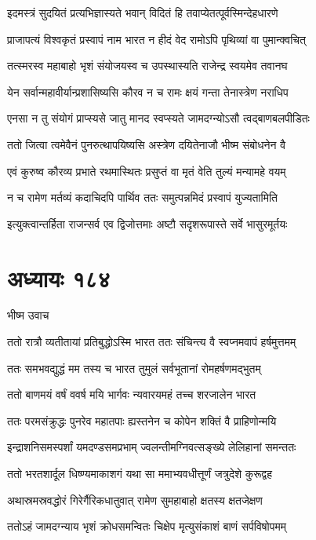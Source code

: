 \twolineshloka
{इदमस्त्रं सुदयितं प्रत्यभिज्ञास्यते भवान्}
{विदितं हि तवाप्येतत्पूर्वस्मिन्देहधारणे}


\twolineshloka
{प्राजापत्यं विश्वकृतं प्रस्वापं नाम भारत}
{न हीदं वेद रामोऽपि पृथिव्यां वा पुमान्क्वचित्}


\twolineshloka
{तत्स्मरस्व महाबाहो भृशं संयोजयस्व च}
{उपस्थास्यति राजेन्द्र स्वयमेव तवानघ}


\twolineshloka
{येन सर्वान्महावीर्यान्प्रशासिष्यसि कौरव}
{न च रामः क्षयं गन्ता तेनास्त्रेण नराधिप}


\twolineshloka
{एनसा न तु संयोगं प्राप्स्यसे जातु मानद}
{स्वप्स्यते जामदग्न्योऽसौ त्वद्बाणबलपीडितः}


\twolineshloka
{ततो जित्वा त्वमेवैनं पुनरुत्थापयिष्यसि}
{अस्त्रेण दयितेनाजौ भीष्म संबोधनेन वै}


\twolineshloka
{एवं कुरुष्व कौरव्य प्रभाते रथमास्थितः}
{प्रसुप्तं वा मृतं वेति तुल्यं मन्यामहे वयम्}


\twolineshloka
{न च रामेण मर्तव्यं कदाचिदपि पार्थिव}
{ततः समुत्पन्नमिदं प्रस्वापं युज्यतामिति}


\twolineshloka
{इत्युक्त्वान्तर्हिता राजन्सर्व एव द्विजोत्तमाः}
{अष्टौ सदृशरूपास्ते सर्वे भासुरमूर्तयः}


\chapter{अध्यायः १८४}
\twolineshloka
{भीष्म उवाच}
{}


\twolineshloka
{ततो रात्रौ व्यतीतायां प्रतिबुद्धोऽस्मि भारत}
{ततः संचिन्त्य वै स्वप्नमवापं हर्षमुत्तमम्}


\twolineshloka
{ततः समभवद्युद्धं मम तस्य च भारत}
{तुमुलं सर्वभूतानां रोमहर्षणमद्भुतम्}


\twolineshloka
{ततो बाणमयं वर्षं ववर्ष मयि भार्गवः}
{न्यवारयमहं तच्च शरजालेन भारत}


\twolineshloka
{ततः परमसंक्रुद्धः पुनरेव महातपाः}
{ह्यस्तनेन च कोपेन शक्तिं वै प्राहिणोन्मयि}


\twolineshloka
{इन्द्राशनिसमस्पर्शां यमदण्डसमप्रभाम्}
{ज्वलन्तीमग्निवत्सङ्ख्ये लेलिहानां समन्ततः}


\twolineshloka
{ततो भरतशार्दूल धिष्ण्यमाकाशगं यथा}
{सा ममाभ्यवधीत्तूर्णं जत्रुदेशे कुरूद्वह}


\twolineshloka
{अथास्रमस्रवद्धोरं गिरेर्गैरिकधातुवात्}
{रामेण सुमहाबाहो क्षतस्य क्षतजेक्षण}


\twolineshloka
{ततोऽहं जामदग्न्याय भृशं क्रोधसमन्वितः}
{चिक्षेप मृत्युसंकाशं बाणं सर्पविषोपमम्}


